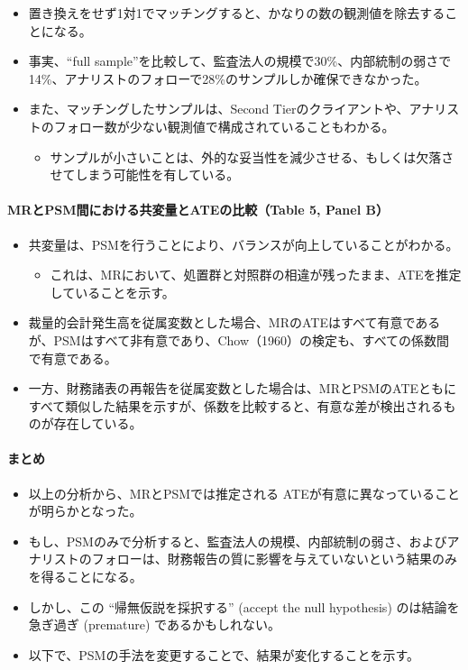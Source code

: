 \begin{itemize}
 \item 置き換えをせず1対1でマッチングすると、かなりの数の観測値を除去することになる。
 \item 事実、“full sample”を比較して、監査法人の規模で30\%、内部統制の弱さで14\%、アナリストのフォローで28\%のサンプルしか確保できなかった。
 \item また、マッチングしたサンプルは、Second Tierのクライアントや、アナリストのフォロー数が少ない観測値で構成されていることもわかる。
  \begin{itemize}
   \item サンプルが小さいことは、外的な妥当性を減少させる、もしくは欠落させてしまう可能性を有している。
  \end{itemize}
\end{itemize}

\paragraph{MRとPSM間における共変量とATEの比較（Table 5, Panel B）}

\begin{itemize}
 \item 共変量は、PSMを行うことにより、バランスが向上していることがわかる。
  \begin{itemize}
   \item これは、MRにおいて、処置群と対照群の相違が残ったまま、ATEを推定していることを示す。
  \end{itemize}
 \item 裁量的会計発生高を従属変数とした場合、MRのATEはすべて有意であるが、PSMはすべて非有意であり、Chow（1960）の検定も、すべての係数間で有意である。
 \item 一方、財務諸表の再報告を従属変数とした場合は、MRとPSMのATEともにすべて類似した結果を示すが、係数を比較すると、有意な差が検出されるものが存在している。
\end{itemize}

\paragraph{まとめ}
\begin{itemize}
 \item 以上の分析から、MRとPSMでは推定される ATEが有意に異なっていることが明らかとなった。
 \item もし、PSMのみで分析すると、監査法人の規模、内部統制の弱さ、およびアナリストのフォローは、財務報告の質に影響を与えていないという結果のみを得ることになる。
 \item しかし、この ``帰無仮説を採択する'' (accept the null hypothesis) のは結論を急ぎ過ぎ (premature) であるかもしれない。
 \item 以下で、PSMの手法を変更することで、結果が変化することを示す。
\end{itemize}

